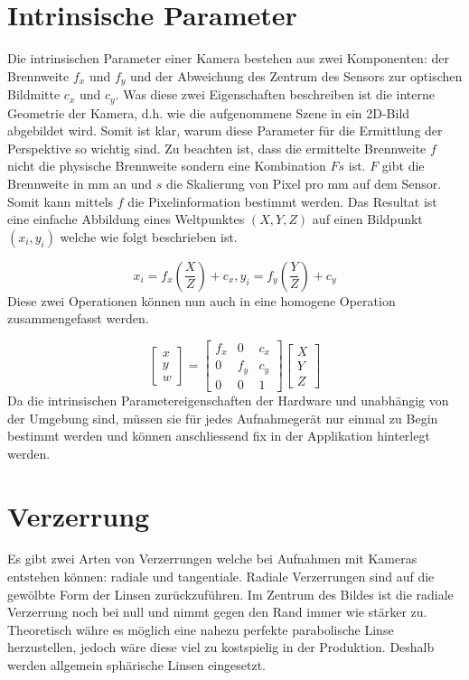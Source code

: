 \section{Intrinsische Parameter}
Die intrinsischen Parameter einer Kamera bestehen aus zwei Komponenten: der Brennweite $f_x$ und $f_y$ und der Abweichung des Zentrum des Sensors zur optischen Bildmitte $c_x$ und $c_y$. Was diese zwei Eigenschaften beschreiben ist die interne Geometrie der Kamera, d.h. wie die aufgenommene Szene in ein 2D-Bild abgebildet wird. Somit ist klar, warum diese Parameter für die Ermittlung der Perspektive so wichtig sind. Zu beachten ist, dass die ermittelte Brennweite $f$ nicht die physische Brennweite sondern eine Kombination $Fs$ ist. $F$ gibt die Brennweite in mm an und $s$ die Skalierung von Pixel pro mm auf dem Sensor. Somit kann mittels $f$ die Pixelinformation bestimmt werden. Das Resultat ist eine einfache Abbildung eines Weltpunktes $(X, Y, Z)$ auf einen Bildpunkt $(x_i, y_i)$ welche wie folgt beschrieben ist.

\begin{equation}
x_i = f_x (\frac{X}{Z}) + c_x,   y_i = f_y (\frac{Y}{Z}) + c_y
\end{equation}
\noindent
Diese zwei Operationen können nun auch in eine homogene Operation zusammengefasst werden.

\begin{equation}
\begin{bmatrix}
x \\ y \\ w
\end{bmatrix} 
=
\begin{bmatrix}
f_x & 0 & c_x \\
0 & f_y & c_y \\
0 & 0 & 1
\end{bmatrix} 
\begin{bmatrix}
X \\ Y \\ Z
\end{bmatrix} 
\end{equation}
\noindent
Da die intrinsischen Parametereigenschaften der Hardware und unabhängig von der Umgebung sind, müssen sie für jedes Aufnahmegerät nur einmal zu Begin bestimmt werden und können anschliessend fix in der Applikation hinterlegt werden.

\section{Verzerrung}
Es gibt zwei Arten von Verzerrungen welche bei Aufnahmen mit Kameras entstehen können: radiale und tangentiale. Radiale Verzerrungen sind auf die gewölbte Form der Linsen zurückzuführen. Im Zentrum des Bildes ist die radiale Verzerrung noch bei null und nimmt gegen den Rand immer wie stärker zu. Theoretisch währe es möglich eine nahezu perfekte parabolische Linse herzustellen, jedoch wäre diese viel zu kostspielig in der Produktion. Deshalb werden allgemein sphärische Linsen eingesetzt.

